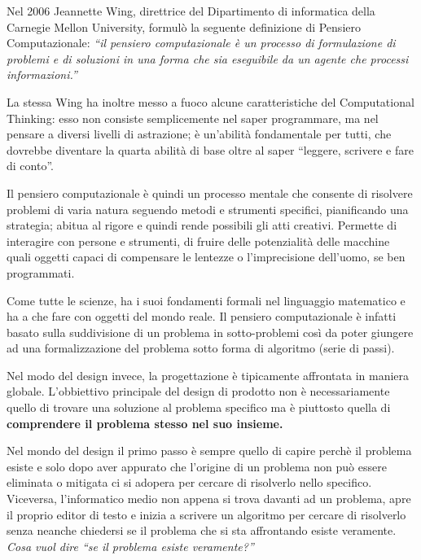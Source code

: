  Nel 2006 Jeannette Wing, direttrice del Dipartimento di informatica della Carnegie Mellon University, formulò la seguente definizione di Pensiero Computazionale:
\textit{``il pensiero computazionale è un processo di formulazione di problemi e di soluzioni in una forma che sia eseguibile da un agente che processi informazioni.''}

La stessa Wing ha inoltre messo a fuoco alcune caratteristiche del Computational Thinking: esso non consiste semplicemente nel saper programmare, ma nel pensare a diversi livelli di astrazione; è un’abilità fondamentale per tutti, che dovrebbe diventare la quarta abilità di base oltre al saper ``leggere, scrivere e fare di conto''.

Il pensiero computazionale è quindi un processo mentale che consente di risolvere problemi di varia natura seguendo metodi e strumenti specifici, pianificando una strategia; abitua al rigore e quindi rende possibili gli atti creativi. Permette di interagire con persone e strumenti, di fruire delle potenzialità delle macchine quali oggetti capaci di compensare le lentezze o l’imprecisione dell’uomo, se ben programmati.

Come tutte le scienze, ha i suoi fondamenti formali nel linguaggio matematico e ha a che fare con oggetti del mondo reale. Il pensiero computazionale è infatti basato sulla suddivisione di un problema in sotto-problemi così da poter giungere ad una formalizzazione del problema sotto forma di algoritmo (serie di passi). 

Nel modo del design invece, la progettazione è tipicamente affrontata in maniera globale. L'obbiettivo principale del design di prodotto non è necessariamente quello di trovare una soluzione al problema specifico ma è piuttosto quella di \textbf{comprendere il problema stesso nel suo insieme.}

Nel mondo del design il primo passo è sempre quello di capire perchè il problema esiste e solo dopo aver appurato che l'origine di un problema non può essere eliminata o mitigata ci si adopera per cercare di risolverlo nello specifico. Viceversa, l'informatico medio non appena si trova davanti ad un problema, apre il proprio editor di testo e inizia a scrivere un algoritmo per cercare di risolverlo senza neanche chiedersi se il problema che si sta affrontando esiste veramente.\\

\textit{Cosa vuol dire ``se il problema esiste veramente?''}\\

